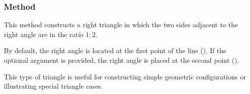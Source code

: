 \vspace{1em}
\begin{minipage}{.5\textwidth}
\begin{center}
\end{center}

\end{minipage}
\begin{minipage}{.5\textwidth}
\begin{tkzexample}
\end{tkzexample}
\end{minipage}

\subsubsection{Method }
\label{ssub:method_imeth_line_half_swap}

This method constructs a right triangle in which the two sides adjacent to the right angle are in the ratio $1:2$.

\medskip
\noindent
By default, the right angle is located at the first point of the line (). If the optional argument  is provided, the right angle is placed at the second point ().

\medskip
\noindent
This type of triangle is useful for constructing simple geometric configurations or illustrating special triangle cases.

